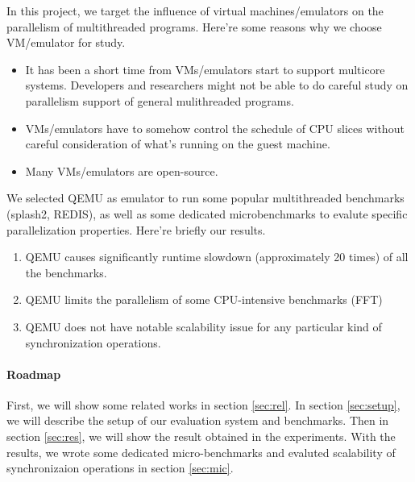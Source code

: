 In this project, we target the influence of virtual machines/emulators on 
the parallelism of multithreaded programs. Here're some reasons why we choose
VM/emulator for study.
\begin{itemize}
\item It has been a short time from VMs/emulators start to support multicore
systems. Developers and researchers might not be able to do careful study 
on parallelism support of general mulithreaded programs.
\item VMs/emulators have to somehow control the schedule of CPU slices 
without careful consideration of what's running on the guest machine. 
\item Many VMs/emulators are open-source.
\end{itemize}

We selected QEMU as emulator to run some popular multithreaded benchmarks
(splash2, REDIS), as well as some dedicated microbenchmarks to evalute 
specific parallelization properties. Here're briefly our results. 

\begin{enumerate}
\item QEMU causes significantly runtime slowdown (approximately 20 times) of all
the benchmarks.
\item QEMU limits the parallelism of some CPU-intensive benchmarks (FFT)
\item QEMU does not have notable scalability issue for any particular kind of 
synchronization operations. 
\end{enumerate}

\paragraph{Roadmap} First, we will show some related works in section 
\ref{sec:rel}. In section \ref{sec:setup}, we will describe the setup of 
our evaluation system and benchmarks. Then in section \ref{sec:res}, we will 
show the result obtained in the experiments. With the results, we wrote some 
dedicated micro-benchmarks and evaluted scalability of synchronizaion operations
in section \ref{sec:mic}.
